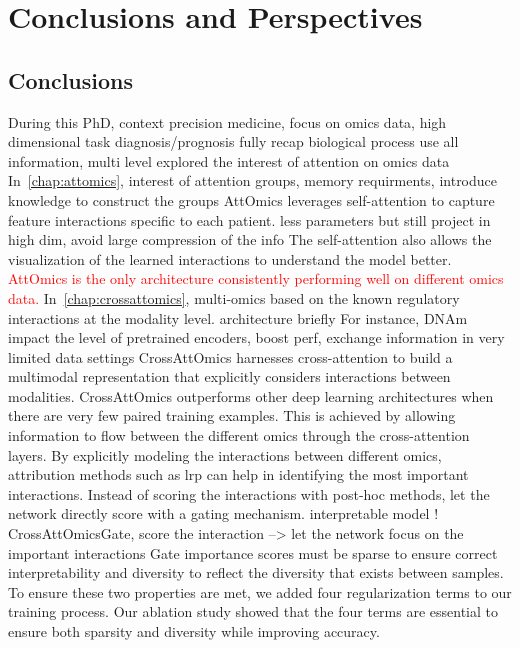 \documentclass[../main.tex]{subfiles}
\begin{document}
\chapter{Conclusions and Perspectives}
\minitocpage
\section{Conclusions}
	During this PhD,
	context precision medicine, focus on omics data, high dimensional
	task diagnosis/prognosis
	fully recap biological process use all information, multi level
	explored the interest of attention on omics data
	In~\cref{chap:attomics}, interest of attention
	groups, memory requirments, introduce knowledge to construct the groups
	AttOmics leverages self-attention to capture feature interactions specific to each patient.
	less parameters but still project in high dim, avoid large compression of the info
	The self-attention also allows the visualization of the learned interactions to understand the model better.
	\textcolor{red}{AttOmics is the only architecture consistently performing well on different omics data.}
	In~\cref{chap:crossattomics}, multi-omics based on the known regulatory interactions at the modality level.
	architecture briefly
	For instance, DNAm impact the level of
	pretrained encoders, boost perf, exchange information in very limited data settings
	CrossAttOmics harnesses cross-attention to build a multimodal representation that explicitly considers interactions between modalities.
	CrossAttOmics outperforms other deep learning architectures when there are very few paired training examples.
	This is achieved by allowing information to flow between the different omics through the cross-attention layers.
	By explicitly modeling the interactions between different omics, attribution methods such as \gls{lrp} can help in identifying the most important interactions.
	Instead of scoring the interactions with post-hoc methods, let the network directly score with a gating mechanism.
	interpretable model !
	CrossAttOmicsGate, score the interaction --> let the network focus on the important interactions
	Gate importance scores must be sparse to ensure correct interpretability and diversity to reflect the diversity that exists between samples.
	To ensure these two properties are met, we added four regularization terms to our training process.
	Our ablation study showed that the four terms are essential to ensure both sparsity and diversity while improving accuracy.
\end{document}
